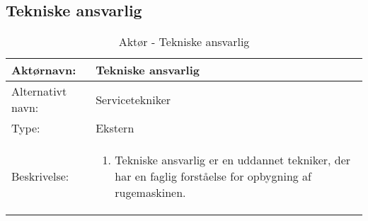 
\subsection{Tekniske ansvarlig}

\begin{table}[H]
\centering
\begin{tabular}[\textwidth]{|p{}|p{}|}
\hline Aktørnavn: & Tekniske ansvarlig \\ 
\hline Alternativt navn: & Servicetekniker \\ 
\hline Type: & Ekstern \\ 
\hline Beskrivelse: & 
		\begin{enumerate}
		\item Tekniske ansvarlig er en uddannet tekniker, der har en faglig forståelse for opbygning af rugemaskinen.
		\end{enumerate} \\ 
\hline
\end{tabular}
\caption{Aktør - Tekniske ansvarlig}
\label{tab:usecase-aktoer-tekniskeansvarlig}
\end{table}

